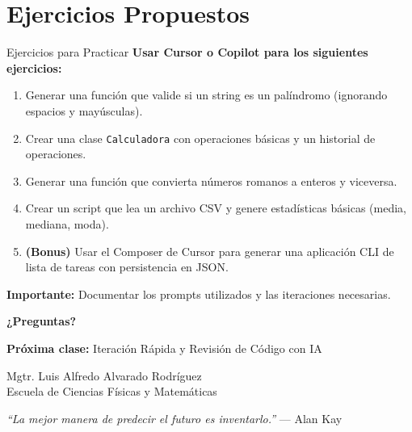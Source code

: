 \documentclass[aspectratio=169]{beamer}
\begin{document}
\section{Ejercicios Propuestos}

\begin{frame}{Ejercicios para Practicar}
    \textbf{Usar Cursor o Copilot para los siguientes ejercicios:}
    \vspace{0.3cm}
    
    \begin{enumerate}
        \setlength\itemsep{0.7em}
        \item Generar una función que valide si un string es un palíndromo (ignorando espacios y mayúsculas).
        
        \item Crear una clase \texttt{Calculadora} con operaciones básicas y un historial de operaciones.
        
        \item Generar una función que convierta números romanos a enteros y viceversa.
        
        \item Crear un script que lea un archivo CSV y genere estadísticas básicas (media, mediana, moda).
        
        \item \textbf{(Bonus)} Usar el Composer de Cursor para generar una aplicación CLI de lista de tareas con persistencia en JSON.
    \end{enumerate}
    
    \vspace{0.3cm}
    \textbf{Importante:} Documentar los prompts utilizados y las iteraciones necesarias.
\end{frame}

\begin{frame}
    \centering
    \Huge \textbf{¿Preguntas?}
    
    \vspace{0.8cm}
    \large
    \textbf{Próxima clase:} Iteración Rápida y Revisión de Código con IA
    
    \vspace{0.5cm}
    \normalsize
    Mgtr. Luis Alfredo Alvarado Rodríguez\\
    \small Escuela de Ciencias Físicas y Matemáticas
    
    \vspace{0.5cm}
    \footnotesize
    \textit{``La mejor manera de predecir el futuro es inventarlo.''} — Alan Kay
\end{frame}
\end{document}
